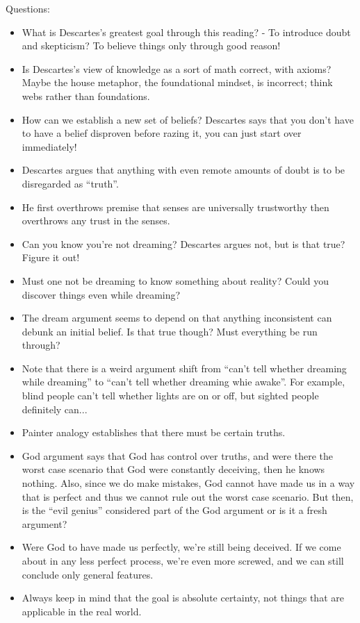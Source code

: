\documentclass{report}
\begin{document}
Questions:
\begin{itemize}
\item What is Descartes's greatest goal through this reading? - To introduce doubt and skepticism? To believe things only through good reason! 
\item Is Descartes's view of knowledge as a sort of math correct, with axioms? Maybe the house metaphor, the foundational mindset, is incorrect; think webs rather than foundations.
\item How can we establish a new set of beliefs? Descartes says that you don't have to have a belief disproven before razing it, you can just start over immediately!
\item Descartes argues that anything with even remote amounts of doubt is to be disregarded as "`truth"'.
\item He first overthrows premise that senses are universally trustworthy then overthrows any trust in the senses.
\item Can you know you're not dreaming? Descartes argues not, but is that true? Figure it out!
\item Must one not be dreaming to know something about reality? Could you discover things even while dreaming?
\item The dream argument seems to depend on that anything inconsistent can debunk an initial belief. Is that true though? Must everything be run through?
\item Note that there is a weird argument shift from "`can't tell whether dreaming while dreaming"' to "`can't tell whether dreaming whie awake"'. For example, blind people can't tell whether lights are on or off, but sighted people definitely can...
\item Painter analogy establishes that there must be certain truths. 
\item God argument says that God has control over truths, and were there the worst case scenario that God were constantly deceiving, then he knows nothing. Also, since we do make mistakes, God cannot have made us in a way that is perfect and thus we cannot rule out the worst case scenario. But then, is the "`evil genius"' considered part of the God argument or is it a fresh argument?
\item Were God to have made us perfectly, we're still being deceived. If we come about in any less perfect process, we're even more screwed, and we can still conclude only general features.
\item Always keep in mind that the goal is absolute certainty, not things that are applicable in the real world. 
\end{itemize}
\end{document}
